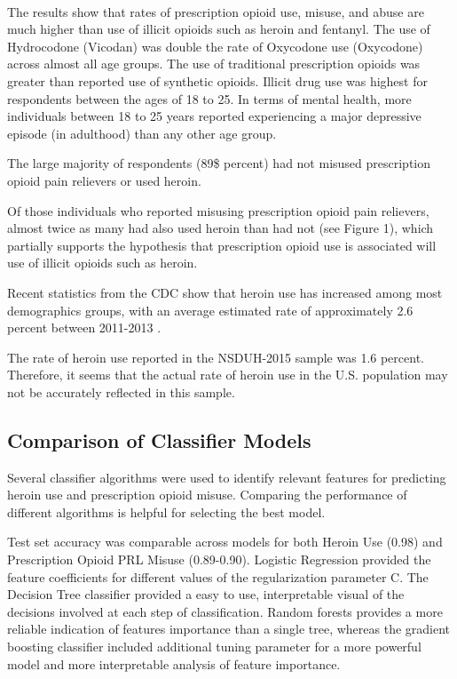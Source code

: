 \\\documentclass[sigconf]{acmart}
\begin{document}

The results show that rates of prescription opioid use, misuse, and abuse are
much higher than use of illicit opioids such as heroin and fentanyl. The use 
of Hydrocodone (Vicodan) was double the rate of Oxycodone use (Oxycodone) 
across almost all age groups. The use of traditional prescription opioids 
was greater than reported use of synthetic opioids. Illicit drug use was 
highest for respondents between the ages of 18 to 25. In terms of mental 
health, more individuals between 18 to 25 years reported experiencing a major 
depressive episode (in adulthood) than any other age group. 

The large majority of respondents (89\$ percent) had not misused 
prescription opioid 
pain relievers or used heroin. 

Of those individuals who reported 
misusing prescription opioid pain relievers, almost twice as many had also
used heroin than had not (see Figure 1), which partially supports the 
hypothesis that prescription opioid use is associated will use of illicit 
opioids such as heroin. 
 
 Recent statistics from the CDC show that heroin use
has increased among most demographics groups, with an average estimated rate 
of approximately 2.6 percent between 2011-2013 \cite{cdc16}.

The rate of heroin use reported in the NSDUH-2015 sample was 1.6 percent. 
Therefore, it seems that the actual rate of heroin use in the U.S. population 
may not be accurately reflected in this sample. 

 

\subsection{Comparison of Classifier Models}

Several classifier algorithms were used to identify relevant features for 
predicting heroin use and prescription opioid misuse. Comparing the performance 
of different algorithms is helpful for  selecting the best model. 

Test set
accuracy was comparable across models for both Heroin Use (0.98) and 
Prescription Opioid PRL Misuse (0.89-0.90). Logistic Regression provided the
feature coefficients for different values of the regularization parameter C. 
The Decision Tree classifier provided a easy to use, interpretable visual of
the decisions involved at each step of classification. Random forests provides
a more reliable indication of features importance than a single tree, 
whereas the gradient boosting classifier included additional tuning 
parameter for a more powerful model and more interpretable analysis of
feature importance. 
\end{document}
